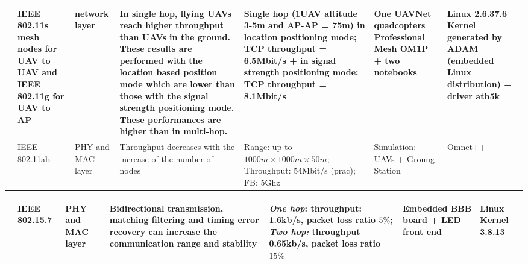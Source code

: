 \documentclass[11pt,openany]{book}
\begin{document}
\begin{landscape}
    \begin{table}[H]
        \centering
        \begin{tabular}{|p{1.5cm}|p{1.7cm}|p{1.3cm}|p{2.9cm}|p{2.7cm}|p{2.3cm}|p{2cm}|}\hline
            [Morgen- thaler et al., 2012] & IEEE 802.11s mesh nodes for UAV to UAV and IEEE 802.11g for UAV to AP & network layer     & In single hop, ﬂying UAVs reach higher throughput than UAVs in the ground. These results are performed with the location based position mode which are lower than those with the signal strength positioning mode. These performances are higher than in multi-hop. & Single hop (1UAV altitude 3-5m and AP-AP = 75m) in location positioning mode; TCP throughput = 6.5Mbit/s + in signal strength positioning mode: TCP throughput = 8.1Mbit/s & One UAVNet quadcopters Professional Mesh OM1P + two notebooks & Linux 2.6.37.6 Kernel generated by ADAM (embedded Linux distribution) + driver ath5k \\\hline
            [Muzaffar and Yanmaz, 2014]   & IEEE 802.11ab                                                         & PHY and MAC layer & Throughput decreases with the increase of the number of nodes                                                                                                                                                                                                       & Range: up to $1000m \times 1000m \times 50m$; Throughput: 54Mbit/s (prac); FB: 5Ghz                                                                                        & Simulation: UAVs + Groung Station                             & Omnet++                                                                              \\\hline
        \end{tabular}
    \end{table}
\end{landscape}
\begin{landscape}
    \begin{table}[H]
        \centering
        \begin{tabular}{|p{1.5cm}|p{1.7cm}|p{1.3cm}|p{2.9cm}|p{2.7cm}|p{2.3cm}|p{2cm}|}\hline
            [Wang et al., 2014] & IEEE 802.15.7 & PHY and MAC layer & Bidirectional transmission, matching ﬁltering and timing error recovery can increase the communication range and stability & \textit{One hop}: throughput: 1.6kb/s, packet loss ratio $5\%$; \textit{Two hop:} throughput 0.65kb/s, packet loss ratio $15\%$ & Embedded BBB board + LED front end & Linux Kernel 3.8.13 \\\hline
        \end{tabular}
    \end{table}
\end{landscape}
\end{document}
